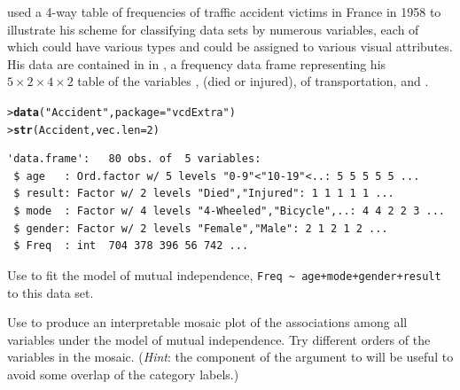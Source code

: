 \documentclass[10pt]{report}\usepackage[]{graphicx}\usepackage[]{color}
\makeatletter
\newcommand{\hlnum}[1]{\textcolor[rgb]{0.686,0.059,0.569}{#1}}%
\newcommand{\hlstr}[1]{\textcolor[rgb]{0.192,0.494,0.8}{#1}}%
\newcommand{\hlstd}[1]{\textcolor[rgb]{0.345,0.345,0.345}{#1}}%
\newcommand{\hlkwc}[1]{\textcolor[rgb]{0.333,0.667,0.333}{#1}}%
\newcommand{\hlkwd}[1]{\textcolor[rgb]{0.737,0.353,0.396}{\textbf{#1}}}%
\newenvironment{kframe}{%
 \def\at@end@of@kframe{}%
 \ifinner\ifhmode%
  \def\at@end@of@kframe{\end{minipage}}%
  \begin{minipage}{\columnwidth}%
 \fi\fi%
 \def\FrameCommand##1{\hskip\@totalleftmargin \hskip-\fboxsep
 \colorbox{shadecolor}{##1}\hskip-\fboxsep
     \hskip-\linewidth \hskip-\@totalleftmargin \hskip\columnwidth}%
 \MakeFramed {\advance\hsize-\width
   \@totalleftmargin\z@ \linewidth\hsize
   \@setminipage}}%
 {\par\unskip\endMakeFramed%
 \at@end@of@kframe}
\newenvironment{knitrout}{}{} %
\renewenvironment{knitrout}{\small\renewcommand{\baselinestretch}{.85}}{} %
\makeatother
\begin{document}
\begin{Exercises}
  \exercise\label{lab:mosaic-accident} \citet[pp. 30--31]{Bertin:83} used a 4-way table of frequencies of traffic accident victims in France in 1958
  to illustrate his scheme for classifying data sets by numerous variables, each of which could have various types
  and could be assigned to various visual attributes. His data are contained in  in ,
  a frequency data frame representing his $5 \times 2 \times 4 \times 2$ table of the variables
  ,  (died or injured),  of transportation, and .
\begin{knitrout}\footnotesize
{}\color{fgcolor}\begin{kframe}
\begin{alltt}
\hlstd{> }\hlkwd{data}\hlstd{(}\hlstr{"Accident"}\hlstd{,} \hlkwc{package} \hlstd{=} \hlstr{"vcdExtra"}\hlstd{)}
\hlstd{> }\hlkwd{str}\hlstd{(Accident,} \hlkwc{vec.len}\hlstd{=}\hlnum{2}\hlstd{)}
\end{alltt}
\begin{verbatim}
'data.frame':	80 obs. of  5 variables:
 $ age   : Ord.factor w/ 5 levels "0-9"<"10-19"<..: 5 5 5 5 5 ...
 $ result: Factor w/ 2 levels "Died","Injured": 1 1 1 1 1 ...
 $ mode  : Factor w/ 4 levels "4-Wheeled","Bicycle",..: 4 4 2 2 3 ...
 $ gender: Factor w/ 2 levels "Female","Male": 2 1 2 1 2 ...
 $ Freq  : int  704 378 396 56 742 ...
\end{verbatim}
\end{kframe}
\end{knitrout}
    \begin{enumerate*}
    
      \item Use  to fit the model of mutual independence, \verb|Freq ~ age+mode+gender+result| to
      this data set.
      \begin{ans}
      \end{ans}
      
      \item Use  to produce an interpretable mosaic plot of the associations among all variables under the
      model of mutual independence.  Try different orders of the variables in the mosaic.  (\emph{Hint}: the 
       component of the 
       argument to  will be useful to avoid some overlap of the category labels.)
      \begin{ans}
      \end{ans}
      

\end{enumerate*}
\end{Exercises}
\end{document}
